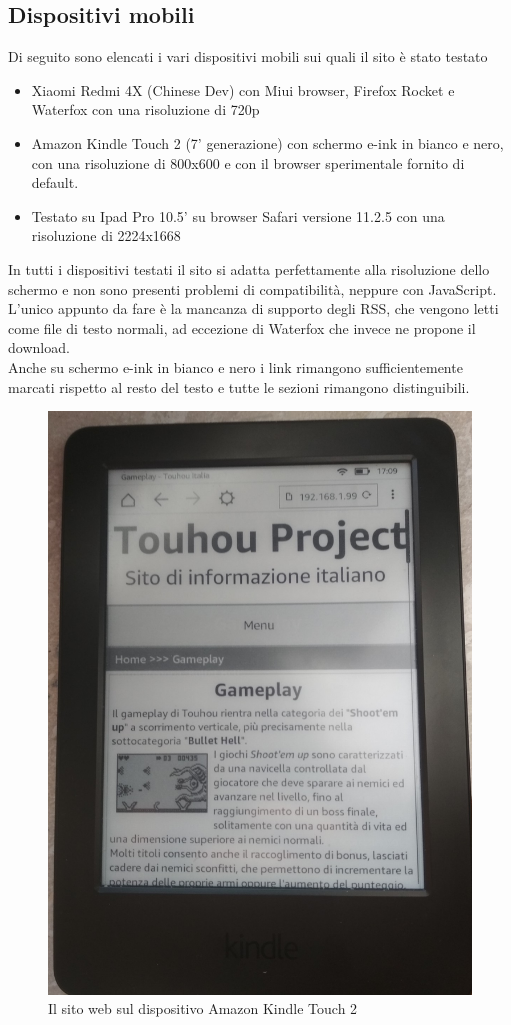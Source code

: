 \documentclass[openany, a4paper, 12pt]{report}
\begin{document}
				\subsection{Dispositivi mobili}
				Di seguito sono elencati i vari dispositivi mobili sui quali il sito è stato testato
				\begin{itemize}
				\item Xiaomi Redmi 4X (Chinese Dev) con Miui browser, Firefox Rocket e Waterfox con una risoluzione di 720p
				\item Amazon Kindle Touch 2 (7' generazione) con schermo e-ink in bianco e nero, con una risoluzione di 800x600 e con il browser sperimentale fornito di default.
        		\item Testato su Ipad Pro 10.5' su browser Safari versione 11.2.5 con una risoluzione di 2224x1668 
				\end{itemize}
			
				In tutti i dispositivi testati il sito si adatta perfettamente alla risoluzione dello schermo e non sono presenti problemi di compatibilità, neppure con JavaScript.\\
				L'unico appunto da fare è la mancanza di supporto degli RSS, che vengono letti come file di testo normali, ad eccezione di Waterfox che invece ne propone il download.\\
				Anche su schermo e-ink in bianco e nero i link rimangono sufficientemente marcati rispetto al resto del testo e tutte le sezioni rimangono distinguibili.
			
				\begin{figure}[H]
					\centering
					\includegraphics[width=0.7\linewidth]{images/Kindle}
					\caption{Il sito web sul dispositivo Amazon Kindle Touch 2}
				\end{figure}
			
\end{document}
